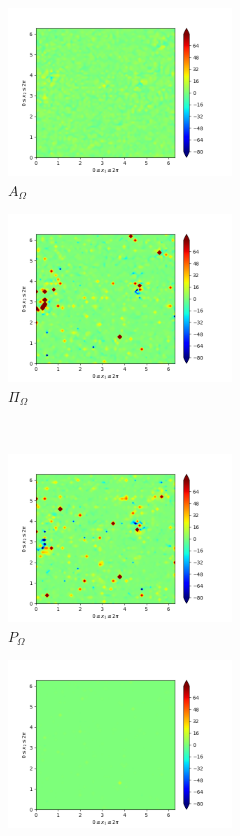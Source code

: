 \begin{figure}[H]
\begin{subfigure}{0.45\textwidth}
        \includegraphics[height=1.75in]{media/run-cds-65/A-enst-1440.png}
        \caption{$A_{\Omega}$}
    \end{subfigure}
    \newline
    \begin{subfigure}{0.45\textwidth}
        \includegraphics[height=1.75in]{media/run-cds-65/Pi-enst-1440.png}
        \caption{$\Pi_{\Omega}$}
    \end{subfigure}
    ~
    \begin{subfigure}{0.45\textwidth}
        \includegraphics[height=1.75in]{media/run-cds-65/P-enst-1440.png}
        \caption{$P_{\Omega}$}
    \end{subfigure}
    \newline
    \begin{subfigure}{0.45\textwidth}
        \includegraphics[height=1.75in]{media/run-cds-65/B-enst-1440.png}

\end{subfigure}
\end{figure}
